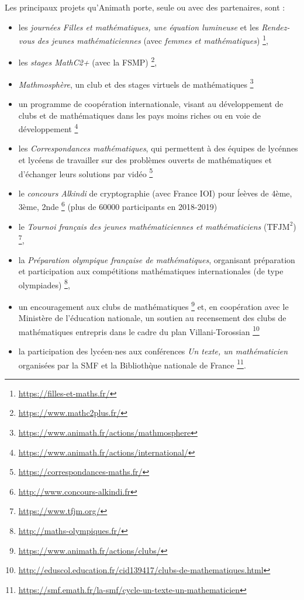 Les principaux projets qu'Animath porte, seule ou avec des partenaires, sont : 
\begin{itemize} 
\item les {\it journ\'ees Filles et math\'ematiques, 
une \'equation lumineuse} et les {\it Rendez-vous des jeunes math\'ematiciennes} (avec {\it femmes et math\'ematiques}) 
\footnote{\url{https://filles-et-maths.fr/}}, 
\item les {\it stages MathC2+} (avec la FSMP)
\footnote{\url{https://www.mathc2plus.fr/}},
\item {\it Mathmosph\`ere}, un club et des stages virtuels de math\'ematiques \footnote{\url{https://www.animath.fr/actions/mathmosphere}}
\item un programme de coop\'eration internationale, visant au d\'eveloppement de clubs et de math\'ematiques dans les pays moins riches ou en voie de d\'eveloppement
\footnote{\url{https://www.animath.fr/actions/international/}}
\item les {\it Correspondances math\'ematiques}, qui permettent \`a des \'equipes de lyc\'ennes et lyc\'eens de travailler sur des probl\`emes ouverts de math\'ematiques et d'\'echanger leurs solutions par vid\'eo \footnote{\url{https://correspondances-maths.fr/}} 
\item le {\it concours Alkindi} de cryptographie (avec France IOI) pour \'le\`eves de 4\`eme, 3\`eme, 2nde 
\footnote{\url{http://www.concours-alkindi.fr}} (plus de 60000 participants en 2018-2019)
\item le {\it Tournoi français des jeunes math\'ematiciennes et math\'ematiciens} ($\text{TFJM}^2$) 
\footnote{\url{https://www.tfjm.org/}}, 
\item la {\it Pr\'eparation olympique fran\c caise de math\'ematiques}, organisant pr\'eparation et participation aux comp\'etitions math\'ematiques internationales (de type olympiades)
\footnote{\url{http://maths-olympiques.fr/}}, 
\item un encouragement aux clubs de math\'ematiques \footnote{\url{https://www.animath.fr/actions/clubs/}} et, en coop\'eration avec le Minist\`ere de l'\'education nationale, un soutien au recensement des clubs de math\'ematiques entrepris dans le cadre du plan Villani-Torossian
\footnote{\url{http://eduscol.education.fr/cid139417/clubs-de-mathematiques.html}}
\item la participation des lyc\'een$\cdot$nes aux conf\'erences {\it Un texte, un math\'ematicien} organis\'ees par la SMF et la Biblioth\`que nationale de France \footnote{\url{https://smf.emath.fr/la-smf/cycle-un-texte-un-mathematicien}}. 
\end{itemize}

